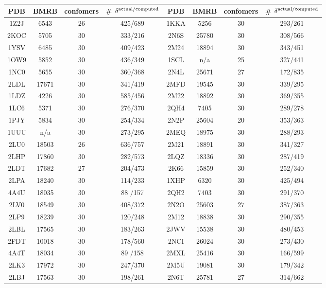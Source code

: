\documentclass[journal=jcisd8,manuscript=article,layout=onecolumn]{achemso}
\begin{document}
\begin{table}[h!]
\centering
\begin{threeparttable}
\begin{tabular}{c c c c | c c c c}
\hline
\hline

PDB & BMRB  & confomers & \# $\delta^{\rm actual/computed}$ &  PDB & BMRB  & confomers & \# $\delta^{\rm actual/computed}$ \\
\hline
\hline
1Z2J & 6543  & 26 & 425/689 & 1KKA & 5256  & 30 & 293/261 \\
2KOC & 5705  & 30 & 333/216 & 2N6S & 25780 & 30 & 308/566 \\
1YSV & 6485  & 30 & 409/423 & 2M24 & 18894 & 30 & 343/451 \\
1OW9 & 5852  & 30 & 436/349 & 1SCL & n/a  & 25 & 327/441 \\
1NC0 & 5655  & 30 & 360/368 & 2N4L & 25671 & 27 & 172/835 \\
2LDL & 17671 & 30 & 341/419 & 2MFD & 19545 & 30 & 339/295 \\
1LDZ & 4226  & 30 & 585/456 & 2M22 & 18892 & 30 & 369/355 \\
1LC6 & 5371  & 30 & 276/370 & 2QH4 & 7405  & 30 & 289/278 \\
1PJY & 5834  & 30 & 254/334 & 2N2P & 25604 & 20 & 353/363 \\
1UUU & n/a  & 30 & 273/295 & 2MEQ & 18975 & 30 & 288/293 \\
2LU0 & 18503 & 26 & 636/757 & 2M21 & 18891 & 30 & 341/327 \\
2LHP & 17860 & 30 & 282/573 & 2LQZ & 18336 & 30 & 287/419 \\
2LDT & 17682 & 27 & 204/473 & 2K66 & 15859 & 30 & 252/340 \\
2LPA & 18240 & 30 & 114/233 & 1XHP & 6320  & 30 & 425/494 \\
4A4U & 18035 & 30 & 88 /157 & 2QH2 & 7403  & 30 & 291/370 \\
2LV0 & 18549 & 30 & 408/372 & 2N2O & 25603 & 27 & 387/363 \\
2LP9 & 18239 & 30 & 120/248 & 2M12 & 18838 & 30 & 290/355 \\
2LBL & 17565 & 30 & 183/263 & 2JWV & 15538 & 30 & 480/453 \\
2FDT & 10018 & 30 & 178/560 & 2NCI & 26024 & 30 & 273/430 \\
4A4T & 18034 & 30 & 89 /158 & 2MXL & 25416 & 30 & 166/599 \\
2LK3 & 17972 & 30 & 247/370 & 2M5U & 19081 & 30 & 179/342 \\
2LBJ & 17563 & 30 & 198/261 & 2N6T & 25781 & 27 & 314/662 \\

\end{tabular}
\end{threeparttable}
\end{table}
\end{document}
